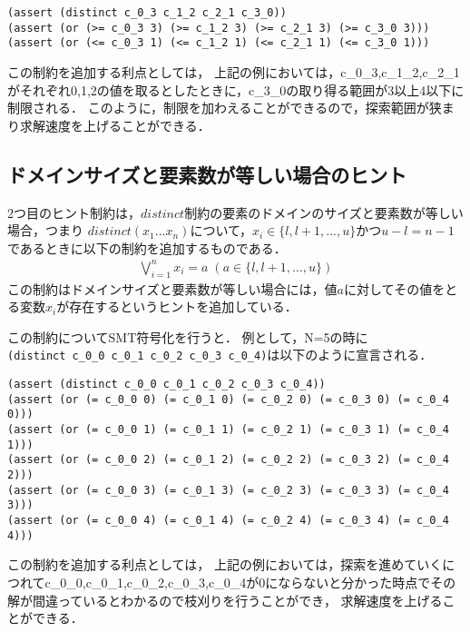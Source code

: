 \begin{verbatim}
(assert (distinct c_0_3 c_1_2 c_2_1 c_3_0))
(assert (or (>= c_0_3 3) (>= c_1_2 3) (>= c_2_1 3) (>= c_3_0 3)))
(assert (or (<= c_0_3 1) (<= c_1_2 1) (<= c_2_1 1) (<= c_3_0 1)))
\end{verbatim}

この制約を追加する利点としては，
上記の例においては，c\_0\_3,c\_1\_2,c\_2\_1がそれぞれ0,1,2の値を取るとしたときに，c\_3\_0の取り得る範囲が3以上4以下に制限される．
このように，制限を加わえることができるので，探索範囲が狭まり求解速度を上げることができる．


\subsection{ドメインサイズと要素数が等しい場合のヒント}
2つ目のヒント制約は，$distinct$制約の要素のドメインのサイズと要素数が等しい場合，つまり
$distinct(x_1 ... x_n)$について，$x_i \in \{l, l+1, ..., u\}$かつ$u-l=n-1$であるときに以下の制約を追加するものである．\\
\begin{eqnarray}
\bigvee_{i=1}^n x_i=a \; (a \in \{l, l+1, ..., u\})
\label{eq:h2}
\end{eqnarray}
この制約はドメインサイズと要素数が等しい場合には，値$a$に対してその値をとる変数$x_i$が存在するというヒントを追加している．

この制約についてSMT符号化を行うと．
例として，N=5の時に\\
\verb|(distinct c_0_0 c_0_1 c_0_2 c_0_3 c_0_4)|は以下のように宣言される．

\begin{verbatim}
(assert (distinct c_0_0 c_0_1 c_0_2 c_0_3 c_0_4))
(assert (or (= c_0_0 0) (= c_0_1 0) (= c_0_2 0) (= c_0_3 0) (= c_0_4 0)))
(assert (or (= c_0_0 1) (= c_0_1 1) (= c_0_2 1) (= c_0_3 1) (= c_0_4 1)))
(assert (or (= c_0_0 2) (= c_0_1 2) (= c_0_2 2) (= c_0_3 2) (= c_0_4 2)))
(assert (or (= c_0_0 3) (= c_0_1 3) (= c_0_2 3) (= c_0_3 3) (= c_0_4 3)))
(assert (or (= c_0_0 4) (= c_0_1 4) (= c_0_2 4) (= c_0_3 4) (= c_0_4 4)))
\end{verbatim}


この制約を追加する利点としては，
上記の例においては，探索を進めていくにつれてc\_0\_0,c\_0\_1,c\_0\_2,c\_0\_3,c\_0\_4が0にならないと分かった時点でその解が間違っているとわかるので枝刈りを行うことができ，
求解速度を上げることができる．



